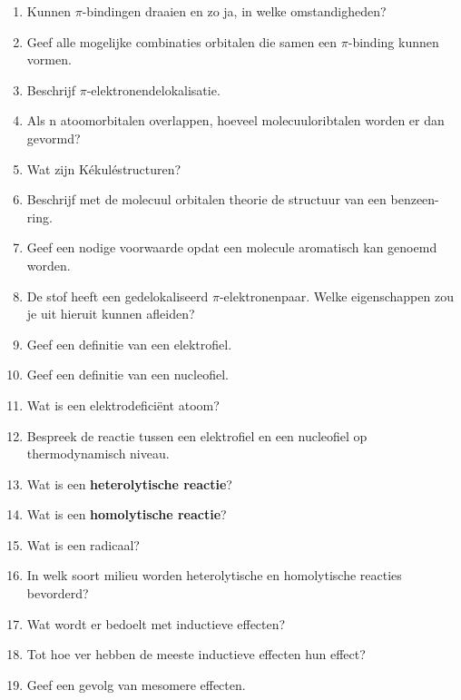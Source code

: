 \documentclass[a4paper,12pt]{article}
\begin{document}
\begin{enumerate}
        \item Kunnen $\pi$-bindingen draaien en zo ja, in welke omstandigheden?
        \item Geef alle mogelijke combinaties orbitalen die samen een  $\pi$-binding kunnen vormen.
        \item Beschrijf  $\pi$-elektronendelokalisatie.
        \item Als n atoomorbitalen overlappen, hoeveel molecuuloribtalen worden er dan gevormd?
        \item Wat zijn K\'ekul\'estructuren?
        \item Beschrijf met de molecuul orbitalen theorie de structuur van een benzeen-ring.
        \item Geef een nodige voorwaarde opdat een molecule aromatisch kan genoemd worden.
        \item De stof  heeft een gedelokaliseerd $\pi$-elektronenpaar. Welke eigenschappen zou je uit hieruit kunnen afleiden? 
        \item Geef een definitie van een elektrofiel.
        \item Geef een definitie van een nucleofiel.
        \item Wat is een elektrodefici\"ent atoom?
        \item Bespreek de reactie tussen een elektrofiel en een nucleofiel op thermodynamisch niveau.
        \item Wat is een \textbf{heterolytische reactie}?
        \item Wat is een \textbf{homolytische reactie}?
        \item Wat is een radicaal?
        \item In welk soort milieu worden heterolytische en homolytische reacties bevorderd?
        \item Wat wordt er bedoelt met inductieve effecten?
        \item Tot hoe ver hebben de meeste inductieve effecten hun effect?
        \item Geef een gevolg van mesomere effecten.
    \end{enumerate}
\end{document}
